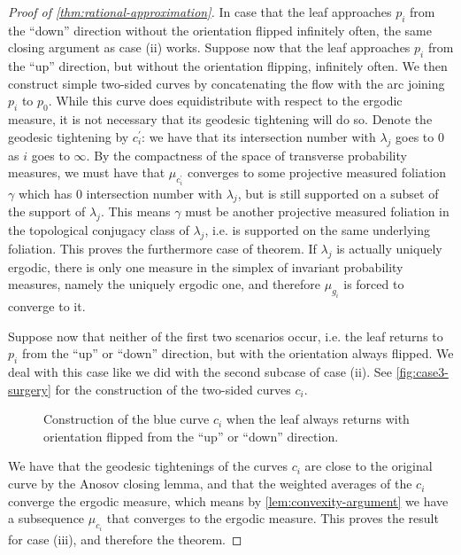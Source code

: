\begin{proof}[Proof of \autoref{thm:rational-approximation}]
  In case that the leaf approaches $p_i$ from the ``down'' direction without the orientation flipped infinitely often, the same closing argument as case (ii) works.
  Suppose now that the leaf approaches $p_i$ from the ``up'' direction, but without the orientation flipping, infinitely often.
  We then construct simple two-sided curves by concatenating the flow with the arc joining $p_i$ to $p_0$.
  While this curve does equidistribute with respect to the ergodic measure, it is not necessary that its geodesic tightening will do so.
  Denote the geodesic tightening by $c_i^{\prime}$: we have that its intersection number with $\lambda_j$ goes to $0$ as $i$ goes to $\infty$.
  By the compactness of the space of transverse probability measures, we must have that $\mu_{c_i^{\prime}}$ converges to some projective measured foliation $\gamma$ which has $0$ intersection number with $\lambda_j$, but is still supported on a subset of the support of $\lambda_j$.
  This means $\gamma$ must be another projective measured foliation in the topological conjugacy class of $\lambda_j$, i.e. is supported on the same underlying foliation.
  This proves the furthermore case of theorem.
  If $\lambda_j$ is actually uniquely ergodic, there is only one measure in the simplex of invariant probability measures, namely the uniquely ergodic one, and therefore $\mu_{g_i}$ is forced to converge to it.

  Suppose now that neither of the first two scenarios occur, i.e. the leaf returns to $p_i$ from the ``up'' or ``down'' direction, but with the orientation always flipped.
  We deal with this case like we did with the second subcase of case (ii).
  See \autoref{fig:case3-surgery} for the construction of the two-sided curves $c_i$.
  \begin{figure}[h]
    \centering
    \caption{Construction of the blue curve $c_i$ when the leaf always returns with orientation flipped from the ``up'' or ``down'' direction.}
    \label{fig:case3-surgery}
  \end{figure}
  We have that the geodesic tightenings of the curves $c_i$ are close to the original curve by the Anosov closing lemma, and that the weighted averages of the $c_i$ converge the ergodic measure, which means by \autoref{lem:convexity-argument} we have a subsequence $\mu_{c_i}$ that converges to the ergodic measure.
  This proves the result for case (iii), and therefore the theorem.
\end{proof}



